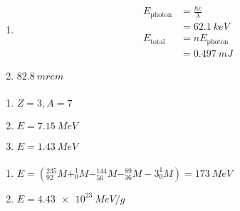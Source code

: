 \documentclass{article}
\begin{document}
\setcounter{subsubsection}{38}
\subsubsection{}

\begin{enumerate}
  \item

        \begin{align*}
          E_\text{photon} & = \frac{h c}{\lambda} \\
                          & = \qty{62.1}{keV}     \\
          E_\text{total}  & = n E_\text{photon}   \\
                          & = \qty{0.497}{mJ}
        \end{align*}

  \item $\qty{82.8}{mrem}$
\end{enumerate}

\setcounter{subsubsection}{40}
\subsubsection{}

\begin{enumerate}
  \item $Z = 3, A = 7$

  \item $E = \qty{7.15}{MeV}$

  \item $E = \qty{1.43}{MeV}$
\end{enumerate}

\setcounter{subsubsection}{42}
\subsubsection{}

\begin{enumerate}
  \item $E = (^{235}_{92} M + ^1_0 M - ^{144}_{56} M - ^{89}_{36} M - 3 ^1_0 M) = \qty{173}{MeV}$

  \item $E = \qty{4.43e23}{MeV/g}$
\end{enumerate}

\setcounter{subsubsection}{44}
\subsubsection{}
\end{document}

